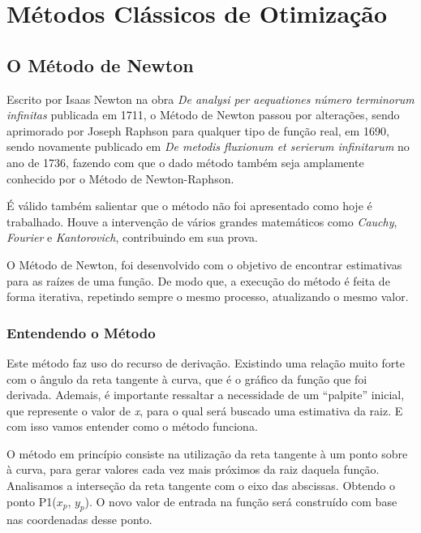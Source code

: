 
\chapter{\Large{Métodos Clássicos de Otimização}}\label{chp:2}


\section{{O Método de Newton}}

\hspace{0.8cm}
Escrito por Isaas Newton na obra \textit{De analysi per aequationes número
terminorum infinitas} publicada em 1711, o Método de Newton passou por
alterações, sendo aprimorado por Joseph Raphson para qualquer tipo de função
real, em 1690, sendo novamente publicado em \textit{De metodis fluxionum et
serierum infinitarum} no ano de 1736, fazendo com que o dado método também seja
amplamente conhecido por o Método de Newton-Raphson.

É válido também salientar que o método não foi apresentado como hoje é
trabalhado. Houve a intervenção de vários grandes matemáticos como
\textit{Cauchy}, \textit{Fourier} e \textit{Kantorovich}, contribuindo em sua
prova.

O Método de Newton, foi desenvolvido com o objetivo de encontrar estimativas
para as raízes de uma função. De modo que, a execução do método é feita de
forma iterativa, repetindo sempre o mesmo processo, atualizando o mesmo valor.

\subsection{Entendendo o Método}

\hspace{0.8cm}
Este método faz uso do recurso de derivação. Existindo uma relação muito
forte com o ângulo da reta tangente à curva, que é o gráfico da função que
foi derivada. Ademais, é importante ressaltar a necessidade de um ``palpite''
inicial, que represente o valor de \textit{x}, para o qual será buscado uma
estimativa da raiz. E com isso vamos entender como o método funciona.

O método em princípio consiste na utilização da reta tangente à um
ponto sobre à curva, para gerar valores cada vez mais próximos da raiz
daquela função. Analisamos a interseção da reta tangente com o eixo das
abscissas. Obtendo o ponto P1($x_p$, $y_p$). O novo valor de entrada na função
será construído com base nas coordenadas desse ponto.

